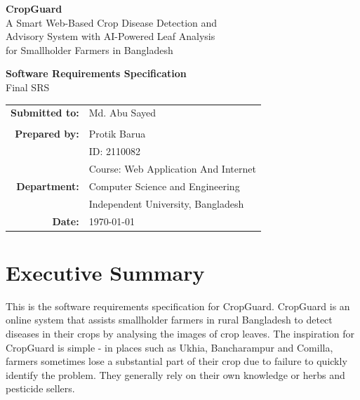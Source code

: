 \documentclass[12pt,a4paper]{article}
\begin{document}
\begin{titlepage}
\centering
\vspace*{1.5cm}

{\Huge\bfseries\textcolor{cropgreen}{CropGuard}}\\[0.5cm]
{\Large A Smart Web-Based Crop Disease Detection and\\
Advisory System with AI-Powered Leaf Analysis\\
for Smallholder Farmers in Bangladesh}

\vspace{1.5cm}

{\large\textbf{Software Requirements Specification}}\\[0.3cm]
{\normalsize Final SRS }

\vspace{2cm}

\begin{tabular}{rl}
\textbf{Submitted to:} & Md. Abu Sayed \\
                         \\[0.8cm]
\textbf{Prepared by:}  & Protik Barua \\
                        & ID: 2110082 \\
                        & Course: Web Application And Internet \\[0.8cm]
\textbf{Department:}   & Computer Science and Engineering \\
                        & Independent University, Bangladesh \\[0.8cm]
\textbf{Date:}         & \today
\end{tabular}

\vfill

\end{titlepage}

\newpage
\tableofcontents
\newpage

\section{Executive Summary}

This is the software requirements specification for CropGuard. CropGuard is an online system that assists smallholder farmers in rural Bangladesh to detect diseases in their crops by analysing the images of crop leaves. The inspiration for CropGuard is simple - in places such as Ukhia, Bancharampur and Comilla, farmers sometimes lose a substantial part of their crop due to failure to quickly identify the problem. They generally rely on their own knowledge or herbs and pesticide sellers.
\end{document}
